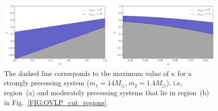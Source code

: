 \begin{figure}[!http]
\centering
\includegraphics[width=1.0\linewidth]{images/kappa_max_bound.pdf} 
\caption{\small{The dashed line corresponds to the maximum value of $\kappa$ for
    a strongly precessing system ($m_1 = 14 M_{\odot}, m_2 = 1.4 M_{\odot}$),
    i.e, region~(a) and moderately precessing systems that lie in region~(b)
    in Fig.~\ref{FIG:OVLP_cut_regions}.}}
\label{FIG:kappa_max_bounds}
\end{figure}
